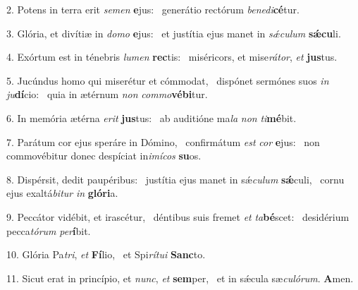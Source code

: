 2. Potens in terra erit \textit{se}\textit{men} \textbf{e}jus: \ast\  generátio rectórum \textit{be}\textit{ne}\textit{di}\textbf{cé}tur.\

3. Glória, et divítiæ in \textit{do}\textit{mo} \textbf{e}jus: \ast\  et justítia ejus manet in \textit{sǽ}\textit{cu}\textit{lum} \textbf{sǽ}\textbf{cu}li.\

4. Exórtum est in ténebris \textit{lu}\textit{men} \textbf{rec}tis: \ast\  miséricors, et mise\textit{rá}\textit{tor}, \textit{et} \textbf{jus}tus.\

5. Jucúndus homo qui miserétur et cómmodat, \dag\  dispónet sermónes suos \textit{in} \textit{ju}\textbf{dí}cio: \ast\  quia in ætérnum \textit{non} \textit{com}\textit{mo}\textbf{vé}\textbf{bi}tur.\

6. In memória ætérna \textit{e}\textit{rit} \textbf{jus}tus: \ast\  ab auditióne ma\textit{la} \textit{non} \textit{ti}\textbf{mé}bit.\

7. Parátum cor ejus speráre in Dómino, \dag\  confirmátum \textit{est} \textit{cor} \textbf{e}jus: \ast\  non commovébitur donec despíciat in\textit{i}\textit{mí}\textit{cos} \textbf{su}os.\

8. Dispérsit, dedit paupéribus: \dag\  justítia ejus manet in sǽ\textit{cu}\textit{lum} \textbf{sǽ}culi, \ast\  cornu ejus exaltá\textit{bi}\textit{tur} \textit{in} \textbf{gló}\textbf{ri}a.\

9. Peccátor vidébit, et irascétur, \dag\  déntibus suis fremet \textit{et} \textit{ta}\textbf{bé}scet: \ast\  desidérium pecca\textit{tó}\textit{rum} \textit{per}\textbf{í}bit.\

10. Glória Pa\textit{tri}, \textit{et} \textbf{Fí}lio, \ast\  et Spi\textit{rí}\textit{tu}\textit{i} \textbf{Sanc}to.\

11. Sicut erat in princípio, et \textit{nunc}, \textit{et} \textbf{sem}per, \ast\  et in sǽcula sæ\textit{cu}\textit{ló}\textit{rum}. \textbf{A}men.\

